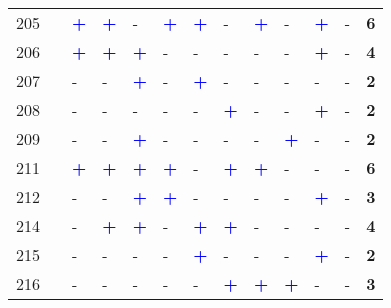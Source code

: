 \begin{longtable}{p{0.5cm}p{4.6cm}p{0.3cm}p{0.3cm}p{0.3cm}p{0.3cm}p{0.3cm}p{0.3cm}p{0.3cm}p{0.3cm}p{0.3cm}p{0.3cm}p{1cm}}
    \small{205} & \small{\textcite{wang_bicycle-transit_2013}}\index{Wang, Rui|pagebf} & \textcolor{blue}{\textbf{+}} & \textcolor{blue}{\textbf{+}} & - & \textcolor{blue}{\textbf{+}} & \textcolor{blue}{\textbf{+}} & - & \textcolor{blue}{\textbf{+}} & - & \textcolor{blue}{\textbf{+}} & - & \textbf{6}\\
    \small{206} & \small{\textcite{wang_relationship_2020}}\index{Wang, Ruoyu|pagebf} & \textcolor{blue}{\textbf{+}} & \textcolor{blue}{\textbf{+}} & \textcolor{blue}{\textbf{+}} & - & - & - & - & - & \textcolor{blue}{\textbf{+}} & - & \textbf{4}\\
    \small{207} & \small{\textcite{wang_interchange_2016}}\index{Wang, Zi-jia|pagebf} & - & - & \textcolor{blue}{\textbf{+}} & - & \textcolor{blue}{\textbf{+}} & - & - & - & - & - & \textbf{2}\\
    \small{208} & \small{\textcite{wang_spatiotemporal_2020}}\index{Wang, Zijia|pagebf} & - & - & - & - & - & \textcolor{blue}{\textbf{+}} & - & - & \textcolor{blue}{\textbf{+}} & - & \textbf{2}\\
    \small{209} & \small{\textcite{welch_long-term_2016}}\index{Welch, Timothy F.|pagebf} & - & - & \textcolor{blue}{\textbf{+}} & - & - & - & - & \textcolor{blue}{\textbf{+}} & - & - & \textbf{2}\\
    \small{211} & \small{\textcite{weliwitiya_bicycle_2019}}\index{Weliwitiya, Hesara|pagebf} & \textcolor{blue}{\textbf{+}} & \textcolor{blue}{\textbf{+}} & \textcolor{blue}{\textbf{+}} & \textcolor{blue}{\textbf{+}} & - & \textcolor{blue}{\textbf{+}} & \textcolor{blue}{\textbf{+}} & - & - & - & \textbf{6}\\
    \small{212} & \small{\textcite{wu_identification_2023}}\index{Wu, Hao|pagebf}\index{Wu, Hao|pagebf} & - & - & \textcolor{blue}{\textbf{+}} & \textcolor{blue}{\textbf{+}} & - & - & - & - & \textcolor{blue}{\textbf{+}} & - & \textbf{3}\\
    \small{214} & \small{\textcite{wu_measuring_2019}}\index{Wu, Xueying|pagebf} & - & \textcolor{blue}{\textbf{+}} & \textcolor{blue}{\textbf{+}} & - & \textcolor{blue}{\textbf{+}} & \textcolor{blue}{\textbf{+}} & - & - & - & - & \textbf{4}\\
    \small{215} & \small{\textcite{yan_spatiotemporal_2021}}\index{Yan Xiang|pagebf} & - & - & - & - & \textcolor{blue}{\textbf{+}} & - & - & - & \textcolor{blue}{\textbf{+}} & - & \textbf{2}\\
    \small{216} & \small{\textcite{yan_evaluating_2023}}\index{Yan, Xiang|pagebf} & - & - & - & - & - & \textcolor{blue}{\textbf{+}} & \textcolor{blue}{\textbf{+}} & \textcolor{blue}{\textbf{+}} & - & - & \textbf{3}\\

\end{longtable}
